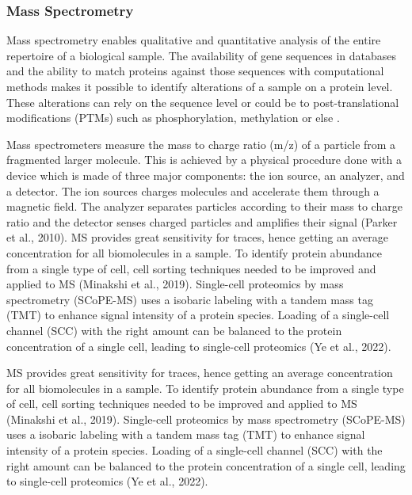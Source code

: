 \documentclass[
]{article}
\begin{document}
\hypertarget{mass-spectrometry}{%
\subsubsection{Mass Spectrometry}\label{mass-spectrometry}}

Mass spectrometry enables qualitative and quantitative analysis of the
entire repertoire of a biological sample. The availability of gene
sequences in databases and the ability to match proteins against those
sequences with computational methods makes it possible to identify
alterations of a sample on a protein level. These alterations can rely
on the sequence level or could be to post-translational modifications
(PTMs) such as phosphorylation, methylation or else
\citep{Aebersold2003}.

Mass spectrometers measure the mass to charge ratio (m/z) of a particle
from a fragmented larger molecule. This is achieved by a physical
procedure done with a device which is made of three major components:
the ion source, an analyzer, and a detector. The ion sources charges
molecules and accelerate them through a magnetic field. The analyzer
separates particles according to their mass to charge ratio and the
detector senses charged particles and amplifies their signal (Parker et
al., 2010). MS provides great sensitivity for traces, hence getting an
average concentration for all biomolecules in a sample. To identify
protein abundance from a single type of cell, cell sorting techniques
needed to be improved and applied to MS (Minakshi et al., 2019).
Single-cell proteomics by mass spectrometry (SCoPE-MS) uses a isobaric
labeling with a tandem mass tag (TMT) to enhance signal intensity of a
protein species. Loading of a single-cell channel (SCC) with the right
amount can be balanced to the protein concentration of a single cell,
leading to single-cell proteomics (Ye et al., 2022).

MS provides great sensitivity for traces, hence getting an average
concentration for all biomolecules in a sample. To identify protein
abundance from a single type of cell, cell sorting techniques needed to
be improved and applied to MS (Minakshi et al., 2019). Single-cell
proteomics by mass spectrometry (SCoPE-MS) uses a isobaric labeling with
a tandem mass tag (TMT) to enhance signal intensity of a protein
species. Loading of a single-cell channel (SCC) with the right amount
can be balanced to the protein concentration of a single cell, leading
to single-cell proteomics (Ye et al., 2022).
\end{document}
